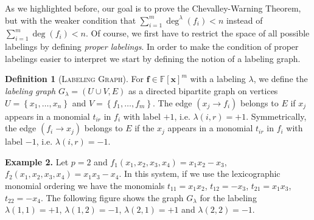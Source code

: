 \documentclass[10pt,a4paper]{article}
\theoremstyle{definition}
\newtheorem{definition}[theorem]{Definition}
\theoremstyle{remark}
\def\p#1{\left(#1\right)}
\def\set#1{\left\{#1\right\}}
\newcommand{\paragr}[1]{\noindent \textbf{\boldmath #1}}
\newcommand{\bbF}{\ensuremath{\mathbb{F}}}
\newcommand{\vecf}{\ensuremath{\boldsymbol{f}}}
\newcommand{\vecx}{\ensuremath{\boldsymbol{x}}}
\begin{document}
  As we highlighted before, our goal is to prove the Chevalley-Warning
Theorem, but with the weaker condition that
$\sum_{i = 1}^m \deg^{\lambda}(f_{i}) < n$ instead of
$\sum_{i = 1}^m \deg(f_i) < n$. Of course, we first have to restrict the
space of all possible labelings by defining {\em proper labelings}.
In order to make the condition of proper labelings easier to interpret
we start by defining the notion of a labeling graph.

\begin{definition}[\textsc{Labeling Graph}] \label{def:labelingGraph}
  For $\vecf \in \bbF[\vecx]^m$ with a labeling $\lambda$, we define the
  \textit{labeling graph} $G_{\lambda} = \p{U \cup V, E}$ as a
  directed bipartite graph on vertices
  $U = \set{x_1, \dots, x_n}$ and $V=\set{f_1, \dots, f_m}$. The edge
  $(x_j \to f_i)$ belongs to $E$ if $x_j$ appears in a monomial
  $t_{i r}$ in $f_i$ with label $+1$, i.e. $\lambda(i, r) = +1$. Symmetrically, the edge
  $(f_i \to x_j)$ belongs to $E$ if the $x_j$ appears in a monomial
  $t_{i r}$ in $f_i$ with label $-1$, i.e. $\lambda(i, r) = -1$.
\end{definition}

\paragr{Example 2.} Let $p = 2$ and
$f_1(x_1, x_2, x_3, x_4) = x_1 x_2 - x_3$,
$f_2(x_1, x_2, x_3, x_4) = x_1 x_3 - x_4$. In this system, if we use the
lexicographic monomial ordering we have the monomials
$t_{1 1} = x_1 x_2$,
$t_{1 2} = - x_3$, $t_{2 1} = x_1 x_3$, $t_{2 2} = - x_4$. The following
figure shows the graph $G_{\lambda}$ for the labeling
$\lambda(1, 1) = +1$, $\lambda(1, 2) = -1$, $\lambda(2, 1) = +1$ and
$\lambda(2, 2) = -1$.

\begin{center}
\end{center}
\end{document}
